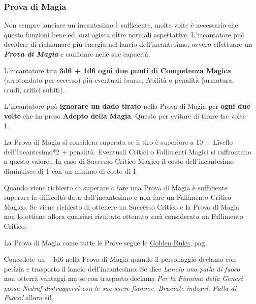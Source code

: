 \begin{multicols}{2}
\subsubsection{Prova di Magia}\label{magieprovadimagia}

Non sempre lanciare un incantesimo è sufficiente, molte volte è necessario che questo funzioni bene ed anzi agisca oltre normali aspettative. L'incantatore può decidere di richiamare più energia nel lancio dell'incantesimo, ovvero effettuare un \emph{\textbf{Prova di Magia}} e confidare nelle sue capacità.

L'incantatore tira \textbf{3d6 + 1d6 ogni due punti di Competenza Magica} (arrotondato per eccesso) più eventuali bonus, Abilità o penalità (armatura, scudi, critici subiti).

L'incantatore può \textbf{ignorare un dado tirato} nella Prova di Magia per \textbf{ogni due volte} che ha preso \textbf{Adepto della Magia}. Questo per evitare di tirare tre volte 1.

La Prova di Magia si considera superata se il tiro è superiore a 10 + Livello dell'Incantesimo*2 + penalità. Eventuali Critici o Fallimenti Magici si raffrontano a questo valore.. In caso di Successo Critico Magico il costo dell'incantesimo diminuisce di 1 con un minimo di costo di 1.

Quando viene richiesto di superare o fare una Prova di Magia è sufficiente superare la difficoltà data dall'incantesimo e non fare un Fallimento Critico Magico. Se viene richiesto di ottenere un Successo Critico e la Prova di Magia non lo ottiene allora qualsiasi risultato ottenuto sarà considerato un Fallimento Critico.

La Prova di Magia come tutte le Prove segue le \hyperlink{goldenrules}{Golden Rules}, pag.\pageref{goldenrules}.

\begin{changemargin}{0.3cm}{0.3cm}\begin{narratore}
Concedete un +1d6 nella Prova di Magia quando il personaggio declama con perizia e trasporto il lancio dell'incantesimo. Se dice \emph{Lancio una palla di fuoco} non otterrà vantaggi ma se con trasporto declama \emph{Per la Fiamma della Genesi possa Nedraf distruggervi con le sue sacre fiamme. Bruciate indegni. Palla di Fuoco!} allora si!.


\end{narratore}
\end{changemargin}
\end{multicols}

